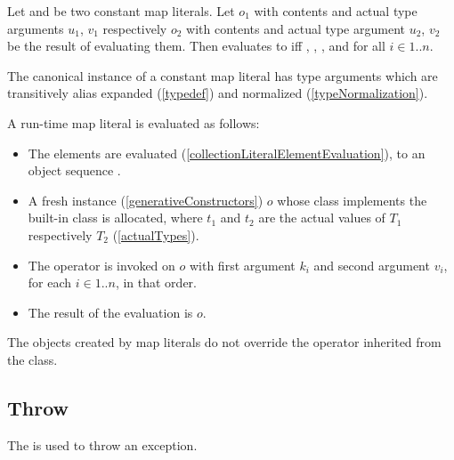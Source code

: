 \documentclass[makeidx]{article}
\begin{document}
{\LMHash{}%
Let 
and 
be two constant map literals.
Let $o_1$ with contents 
and actual type arguments $u_1$, $v_1$
respectively
$o_2$ with contents 
and actual type argument $u_2$, $v_2$
be the result of evaluating them.
Then  evaluates to \TRUE{} if{}f
, ,
, and
for all $i \in 1 .. n$.


\LMHash{}%
The canonical instance of a constant map literal has type arguments
which are transitively alias expanded
(\ref{typedef})
and normalized
(\ref{typeNormalization}).

\LMHash{}%
A run-time map literal
is evaluated as follows:
\begin{itemize}
\item
  The elements  are evaluated
  (\ref{collectionLiteralElementEvaluation}),
  to an object sequence .
\item
  A fresh instance (\ref{generativeConstructors}) $o$
  whose class implements the built-in class 
  is allocated,
  where $t_1$ and $t_2$ are the actual values of $T_1$ respectively $T_2$
  (\ref{actualTypes}).
\item
  The operator \lit{[]=} is invoked on $o$
  with first argument $k_i$ and second argument $v_i$,
  for each $i \in 1 .. n$, in that order.
\item
  The result of the evaluation is $o$.
\end{itemize}

\LMHash{}%
The objects created by map literals do not override
the \lit{==} operator inherited from the  class.


\subsection{Throw}

\LMHash{}%
The  is used to throw an exception.

}
\end{document}
